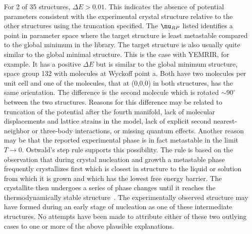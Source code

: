 \documentclass[preprint]{iucr}              %
\newcommand{\mb}[1]{\ensuremath{\mbox{\boldmath $ #1 $}}}
\begin{document}
For 2 of 35 structures, $\Delta E > 0.01$.  This indicates the
absence of potential parameters consistent with the experimental
crystal structure relative to the other structures using the
truncation specified.  The $\mb{\nu}_{RP}$ listed identifies a point
in parameter space where the target structure is least metastable
compared to the global minimum in the library.  The target structure
is also usually quite similar to the global minimal structure. This
is the case with YEMRIR, for example. It has a positive $\Delta E$
but is similar to the global minimum structure, space group 132 with
molecules at Wyckoff point a. Both have two molecules per unit cell
and one of the molecules, that at (0,0,0) in both structures, has
the same orientation.  The difference is the second molecule which
is rotated $\sim 90^\circ$ between the two structures. Reasons for
this difference may be related to truncation of the potential after
the fourth manifold, lack of molecular displacements and lattice
strains in the model, lack of explicit second nearest-neighbor or
three-body interactions, or missing quantum effects.  Another reason
may be that the reported experimental phase is in fact metastable in
the limit $T\rightarrow 0$. Ostwald's step rule supports this possibility.  The rule is based on the observation that during crystal nucleation and growth a metastable phase
frequently crystallizes first which is closest in structure to the liquid or solution from which it is grown and which has the lowest free energy barrier. The crystallite then
undergoes a series of phase changes until it reaches the
thermodynamically stable structure~\cite{Schmalzried03}. The
experimentally observed structure may have formed during an early
stage of nucleation as one of these intermediate structures.  No attempts have been made to attribute either of these two outlying cases to one or more of the above plausible explanations.
\end{document}
